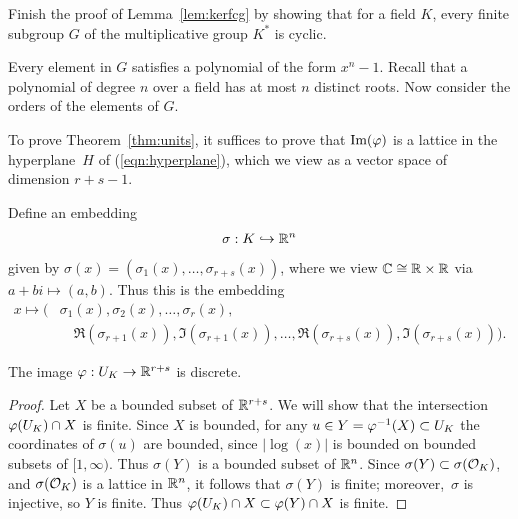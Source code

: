 \begin{exercise}\label{ex:finitesubgroupoffieldcyclic}
	Finish the proof of Lemma~\ref{lem:kerfcg}
	by showing that for a field $K$, every finite
	subgroup $G$ of the multiplicative group $K^*$
	is cyclic.
	
	\begin{hint}
		Every element in $G$ satisfies a polynomial
		of the form $x^n-1$. Recall that a polynomial
		of degree $n$ over a field has at most $n$
		distinct roots. Now consider the orders
		of the elements of $G$.
	\end{hint}
\end{exercise}

To prove Theorem~\ref{thm:units}, it suffices to prove that
$\text{Im}(\varphi)$ is a lattice in the hyperplane~$H$ of
(\ref{eqn:hyperplane}), which we view as a vector space of dimension
$r+s-1$.

Define an embedding
\begin{equation}\label{eqn:sigma3}
 \sigma : K\hookrightarrow \mathbb{R}^n
\end{equation}
given by $\sigma(x) = (\sigma_1(x),\ldots,\sigma_{r+s}(x))$,
where we view $\mathbb{C}\cong \mathbb{R}\times \mathbb{R}$ via $a+b i\mapsto (a,b)$.
Thus this is the embedding
\begin{align*}
 x\mapsto \big(&\sigma_1(x), \sigma_2(x),\ldots, \sigma_r(x),\\
     &\quad \Re(\sigma_{r+1}(x)), \Im(\sigma_{r+1}(x)),
    \ldots, \Re(\sigma_{r+s}(x)), \Im(\sigma_{r+s}(x))\big).
\end{align*}

\begin{lemma}\label{lem:ukdiscrete}
The image $\varphi:U_K\to \mathbb{R}^{r+s}$ is discrete.
\end{lemma}
\begin{proof}
Let $X$ be a bounded subset of $\mathbb{R}^{r+s}$.
We will show that the intersection $\varphi(U_K)\cap X$ is finite.
Since $X$ is bounded, for any $u\in
Y=\varphi^{-1}(X)\subset U_K$ the coordinates of $\sigma(u)$ are bounded,
since $|\log(x)|$ is bounded on bounded subsets
of $[1,\infty)$.
Thus $\sigma(Y)$ is
a bounded subset of $\mathbb{R}^n$.  Since $\sigma(Y)\subset \sigma(\mathcal{O}_K)$,
and $\sigma(\mathcal{O}_K)$ is a lattice in $\mathbb{R}^n$, it follows that $\sigma(Y)$
is finite; moreover,~$\sigma$ is injective, so $Y$ is finite.
Thus $\varphi(U_K)\cap X \subset \varphi(Y) \cap X$ is finite.
\end{proof}

